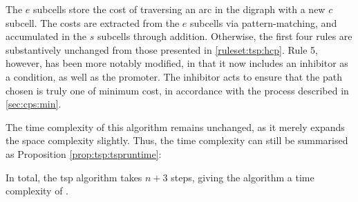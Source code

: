 The \(e\) subcells store the cost of traversing an arc in the digraph with a new \(c\) subcell.  The costs are extracted from the \(e\) subcells via pattern-matching, and accumulated in the \(s\) subcells through addition.  Otherwise, the first four rules are substantively unchanged from those presented in \cref{ruleset:tsp:hcp}.  Rule 5, however, has been more notably modified, in that it now includes an inhibitor as a condition, as well as the promoter.  The inhibitor acts to ensure that the path chosen is truly one of minimum cost, in accordance with the process described in \cref{sec:cps:min}.

The time complexity of this algorithm remains unchanged, as it merely expands the space complexity slightly.  Thus, the time complexity can still be summarised as Proposition \ref{prop:tsp:tspruntime}:

\begin{proposition}
In total, the \gls{tsp} algorithm takes \(n + 3\) steps, giving the algorithm a time complexity of .
\label{prop:tsp:tspruntime}
\end{proposition}